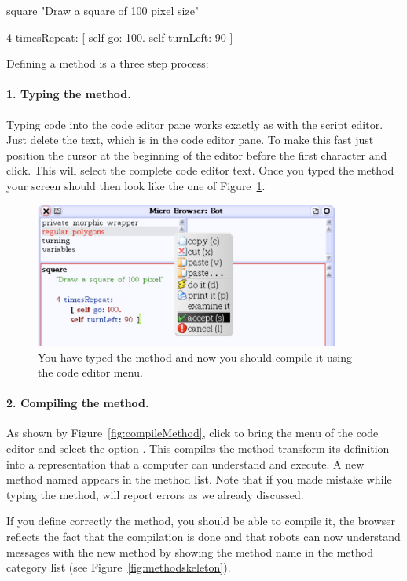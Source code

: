 \begin{method}\label{mth:square}
square 
   "Draw a square of 100 pixel size"

   4 timesRepeat: 
                [ self go: 100.
                self turnLeft: 90 ]
\end{method}

Defining a method is a three step process:

\paragraph{1. Typing the method.} Typing code into the code editor 
pane works exactly as with the script editor. Just delete the text,
which is in the code editor pane. To make this fast just position the cursor at
the beginning of the editor before the first character and click. This will select the complete code editor text. Once you typed the method your screen should then look like the one of Figure~\ref{fig:firstMethod}.

\begin{figure}
\centerline{\includegraphics[width=10cm]{tbFive}} 
\caption{You have typed the method  and now you should compile it using the code editor menu.\label{fig:firstMethod}}
\end{figure}

\paragraph{2. Compiling the method.} As shown by Figure~\ref{fig:compileMethod}, click to bring the menu  of the code editor and select the option .
This compiles the method \ie transform its definition into a representation that a computer can understand and execute. A new method named  appears in the method list.  Note that if you made mistake while typing the method, \sq will report errors as we already discussed.

If you define correctly the method, you should be able to compile it, the browser reflects the fact that the compilation is done and that robots can now understand messages with the new method by showing the method name in the method category list (see Figure~\ref{fig:methodskeleton}).


